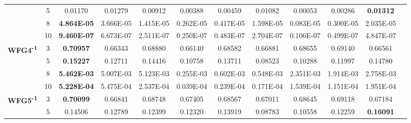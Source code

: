 \documentclass{sig-alternate}
\begin{document}
\begin{table}[!htb]
\begin{tabular}{|c|c|c|c|c|c|c|c|c|c|c|c|}
                                                      & 5          & 0.01170            & 0.01279            & 0.00912               & 0.00388          & 0.00459             & 0.01082             & 0.00053            & 0.00286              & \textbf{0.01312}   \\ \cline{2-11} 
                                                      & 8          & \textbf{4.864E-05} & 3.666E-05          & 1.415E-05             & 0.262E-05        & 0.417E-05           & 1.598E-05           & 0.083E-05          & 0.300E-05            & 2.035E-05          \\ \cline{2-11} 
                                                      & 10         & \textbf{9.460E-07} & 6.673E-07          & 2.511E-07             & 0.250E-07        & 0.483E-07           & 2.704E-07           & 0.106E-07          & 0.499E-07            & 4.847E-07          \\ \hline
\multirow{4}{*}{\textbf{WFG4\textsuperscript{-1}}}  & 3          & \textbf{0.70957}   & 0.66343            & 0.68880               & 0.66140          & 0.68582             & 0.66881             & 0.68655            & 0.69140              & 0.66561            \\ \cline{2-11} 
                                                      & 5          & \textbf{0.15227}   & 0.12711            & 0.14416               & 0.10758          & 0.13711             & 0.08523             & 0.10288            & 0.11997              & 0.14780            \\ \cline{2-11} 
                                                      & 8          & \textbf{5.462E-03} & 5.007E-03          & 5.123E-03             & 0.255E-03        & 0.602E-03           & 0.548E-03           & 2.351E-03          & 1.914E-03            & 2.758E-03          \\ \cline{2-11} 
                                                      & 10         & \textbf{5.228E-04} & 5.475E-04          & 2.537E-04             & 0.039E-04        & 0.239E-04           & 0.171E-04           & 1.539E-04          & 1.151E-04            & 1.951E-04          \\ \hline
\multirow{4}{*}{\textbf{WFG5\textsuperscript{-1}}}  & 3          & \textbf{0.70099}   & 0.66841            & 0.68748               & 0.67405          & 0.68567             & 0.67011             & 0.68645            & 0.69118              & 0.67184            \\ \cline{2-11} 
                                                      & 5          & 0.14506            & 0.12789            & 0.12399               & 0.12320          & 0.13919             & 0.08783             & 0.10558            & 0.12259              & \textbf{0.16091}   \\ \cline{2-11} 

\end{tabular}
\end{table}
\end{document}
